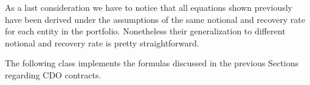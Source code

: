 As a last consideration we have to notice that all equations shown previously have been derived under the assumptions of the same notional and recovery rate for each entity in the portfolio. Nonetheless their generalization to different notional and recovery rate is pretty straightforward.
 
%

The following class implements the formulas discussed in the previous Sections regarding CDO contracts.

